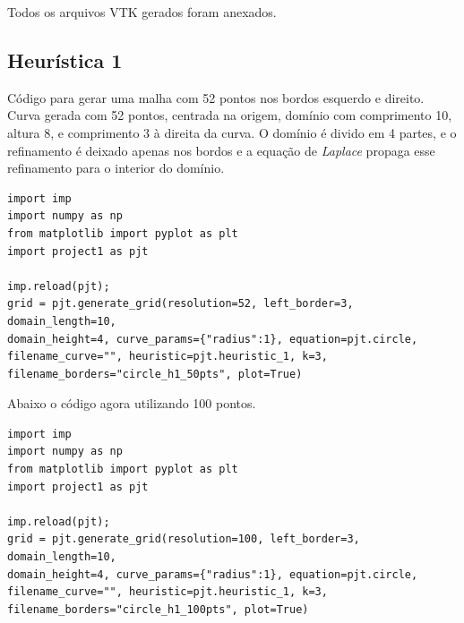 \documentclass[a4paper]{article}
\begin{document}
Todos os arquivos VTK gerados foram anexados.

\subsection{Heurística 1}

Código para gerar uma malha com 52 pontos nos bordos esquerdo e direito. Curva gerada com 52 pontos, centrada na origem, domínio com comprimento 10, altura 8, e comprimento 3 à direita da curva. O domínio é divido em 4 partes, e o refinamento é deixado apenas nos bordos e a equação de \textit{Laplace} propaga esse refinamento para o interior do domínio.


\begin{verbatim}
import imp
import numpy as np
from matplotlib import pyplot as plt
import project1 as pjt

imp.reload(pjt);  
grid = pjt.generate_grid(resolution=52, left_border=3, domain_length=10, 
domain_height=4, curve_params={"radius":1}, equation=pjt.circle, 
filename_curve="", heuristic=pjt.heuristic_1, k=3, filename_borders="circle_h1_50pts", plot=True)
\end{verbatim}

Abaixo o código agora utilizando 100 pontos.
\begin{verbatim}
import imp
import numpy as np
from matplotlib import pyplot as plt
import project1 as pjt

imp.reload(pjt);  
grid = pjt.generate_grid(resolution=100, left_border=3, domain_length=10, 
domain_height=4, curve_params={"radius":1}, equation=pjt.circle, 
filename_curve="", heuristic=pjt.heuristic_1, k=3, filename_borders="circle_h1_100pts", plot=True)
\end{verbatim}


%
\end{document}
